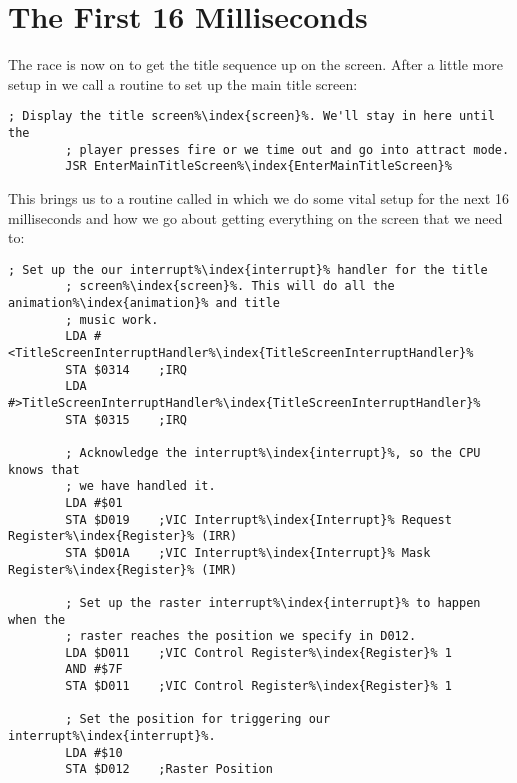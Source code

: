 \chapter{The First 16 Milliseconds} 
\label{sec:first16}
\lstset{style=6502Style}

The race is now on to get the title sequence up on the screen. After a little more setup in 
we call a routine to set up the main title screen:

\begin{lstlisting}[caption=In \icode{MainControlLoop\index{MainControlLoop}},escapechar=\%]
        ; Display the title screen%\index{screen}%. We'll stay in here until the
        ; player presses fire or we time out and go into attract mode.
        JSR EnterMainTitleScreen%\index{EnterMainTitleScreen}%
\end{lstlisting}

This brings us to a routine called  in
which we do some vital setup for the next 16 milliseconds and how we go about getting everything
on the screen that we need to:


\begin{lstlisting}[caption=In \icode{InitializeSpritesAndInterruptsForTitleScreen\index{InitializeSpritesAndInterruptsForTitleScreen}},escapechar=\%]
        ; Set up the our interrupt%\index{interrupt}% handler for the title
        ; screen%\index{screen}%. This will do all the animation%\index{animation}% and title
        ; music work.
        LDA #<TitleScreenInterruptHandler%\index{TitleScreenInterruptHandler}%
        STA $0314    ;IRQ
        LDA #>TitleScreenInterruptHandler%\index{TitleScreenInterruptHandler}%
        STA $0315    ;IRQ

        ; Acknowledge the interrupt%\index{interrupt}%, so the CPU knows that
        ; we have handled it.
        LDA #$01
        STA $D019    ;VIC Interrupt%\index{Interrupt}% Request Register%\index{Register}% (IRR)
        STA $D01A    ;VIC Interrupt%\index{Interrupt}% Mask Register%\index{Register}% (IMR)

        ; Set up the raster interrupt%\index{interrupt}% to happen when the
        ; raster reaches the position we specify in D012.
        LDA $D011    ;VIC Control Register%\index{Register}% 1
        AND #$7F
        STA $D011    ;VIC Control Register%\index{Register}% 1

        ; Set the position for triggering our interrupt%\index{interrupt}%.
        LDA #$10
        STA $D012    ;Raster Position
\end{lstlisting}


